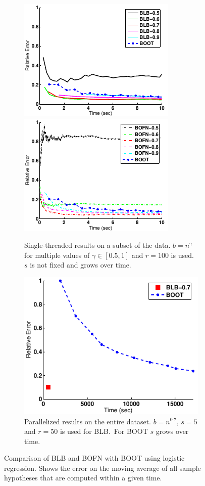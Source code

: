 \begin{figure}
	\begin{subfigure}[t]{0.67\textwidth}
		\centering
		\includegraphics[width=0.49\linewidth]{gfx/blb/time1.pdf}
		\includegraphics[width=0.49\linewidth]{gfx/blb/time2.pdf}
		\caption{
			Single-threaded results on a subset of the data.
			\(b = n^\gamma\) for multiple values of \(\gamma \in [0.5, 1]\) and \(r = 100\) is used.
			\(s\) is not fixed and grows over time.
		}\label{fig:blb:eval:single}
	\end{subfigure}
	\begin{subfigure}[t]{0.32\textwidth}
		\centering
		\includegraphics[width=\linewidth]{gfx/blb/parallel.pdf}
		\caption{
			Parallelized results on the entire dataset.
			\(b = n^{0.7}\), \(s = 5\) and \(r = 50\) is used for BLB.\
			For BOOT \(s\) grows over time.
		}\label{fig:blb:eval:parallel}
	\end{subfigure}
	\caption{
		Comparison of BLB and BOFN with BOOT using logistic regression.
		Shows the error on the moving average of all sample hypotheses that are computed within a given time.
	}\label{fig:blb:eval}
\end{figure}

